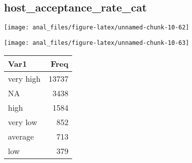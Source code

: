 \hypertarget{host_acceptance_rate_cat}{%
\subsection{host\_acceptance\_rate\_cat}\label{host_acceptance_rate_cat}}

\begin{center}\texttt{[image: anal\_files/figure-latex/unnamed-chunk-10-62]} \end{center}

\begin{center}\texttt{[image: anal\_files/figure-latex/unnamed-chunk-10-63]} \end{center}

\begin{table}[H]
\centering
\begin{tabular}[t]{lr}
\toprule
Var1 & Freq\\
\midrule
very high & 13737\\
NA & 3438\\
high & 1584\\
very low & 852\\
average & 713\\
\addlinespace
low & 379\\
\bottomrule
\end{tabular}
\end{table}
\pagebreak
